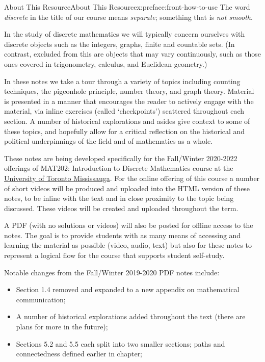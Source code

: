 \documentclass[oneside,10pt,]{book}
\numberwithin{equation}{section}
\begin{document}
\begin{preface}{About This Resource}{}{About This Resource}{}{}{x:preface:front-how-to-use}
The word \emph{discrete} in the title of our course means \emph{separate}; something that is \emph{not smooth}.%
\par
In the study of discrete mathematics we will typically concern ourselves with discrete objects such as the integers, graphs, finite and countable sets. (In contrast, excluded from this are objects that may vary continuously, such as those ones covered in trigonometry, calculus, and Euclidean geometry.)%
\par
In these notes we take a tour through a variety of topics including counting techniques, the pigeonhole principle, number theory, and graph theory. Material is presented in a manner that encourages the reader to actively engage with the material, via inline exercises (called `checkpoints') scattered throughout each section. A number of historical explorations and asides give context to some of these topics, and hopefully allow for a critical reflection on the historical and political underpinnings of the field and of mathematics as a whole.%
\par
These notes are being developed specifically for the Fall\slash{}Winter 2020-2022 offerings of MAT202: Introduction to Discrete Mathematics course at the \href{https://www.utm.utoronto.ca/math-cs-stats/home}{University of Toronto Mississauga}. For the online offering of this course a number of short videos will be produced and uploaded into the HTML version of these notes, to be inline with the text and in close proximity to the topic being discussed. These videos will be created and uploaded throughout the term.%
\par
A PDF (with no solutions or videos) will also be posted for offline access to the notes. The goal is to provide students with as many means of accessing and learning the material as possible (video, audio, text) but also for these notes to represent a logical flow for the course that supports student self-study.%
\par
Notable changes from the Fall\slash{}Winter 2019-2020 PDF notes include:%
\begin{itemize}[label=\textbullet]
\item{}Section 1.4 removed and expanded to a new appendix on mathematical communication;%
\item{}A number of historical explorations added throughout the text (there are plans for more in the future);%
\item{}Sections 5.2 and 5.5 each split into two smaller sections; paths and connectedness defined earlier in chapter;%

\end{itemize}
\end{preface}
\end{document}
